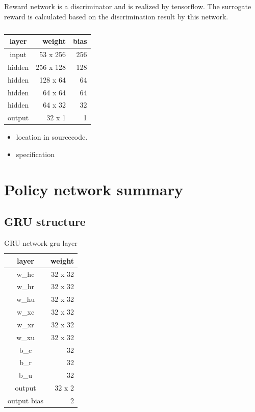 Reward network is a discriminator and is realized by tensorflow. The surrogate reward is calculated based on the discrimination result by this network.

\begin{table}[H]
\centering
\begin{tabular}{|c|r|r|}
\hline 
layer  & weight   & bias \\ \hline \hline
input  & 53 x 256 & 256  \\
hidden & 256 x 128 & 128 \\ 
hidden & 128 x 64 & 64 \\ 
hidden & 64 x 64 & 64 \\ 
hidden & 64 x 32 & 32 \\ 
output & 32 x 1 & 1 \\ 
\hline
\end{tabular} 
\caption{}
\label{tab:reward_network}
\end{table}


\begin{itemize}
\item location in sourcecode.
\item specification
\end{itemize}


\section{Policy network summary}


\subsection{GRU structure}


\begin{table}[H]
\centering
\begin{tabular}{|c|r|}
\hline 
layer  & weight    \\ \hline \hline
w\_hc  & 32 x 32   \\
w\_hr  & 32 x 32   \\
w\_hu  & 32 x 32   \\
w\_xc  & 32 x 32   \\
w\_xr  & 32 x 32   \\
w\_xu  & 32 x 32   \\
b\_c  & 32   \\
b\_r  & 32   \\
b\_u  & 32   \\
output & 32 x 2   \\
output bias & 2   \\
\hline
\end{tabular} 
\caption{GRU network gru layer}
\label{tab:reward_gru_gru_network}
\end{table}

